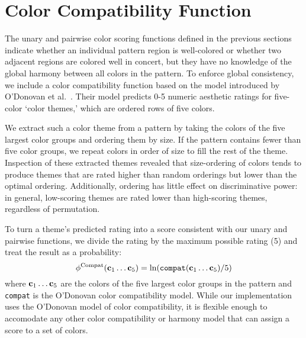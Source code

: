 \section{Color Compatibility Function}
\label{sec:colorCompat}

The unary and pairwise color scoring functions defined in the previous sections indicate whether an individual pattern region is well-colored or whether two adjacent regions are colored well in concert, but they have no knowledge of the global harmony between all colors in the pattern. To enforce global consistency, we include a color compatibility function based on the model introduced by O'Donovan et al.~. Their model predicts 0-5 numeric aesthetic ratings for five-color `color themes,' which are ordered rows of five colors. 

We extract such a color theme from a pattern by taking the colors of the five largest color groups and ordering them by size. If the pattern contains fewer than five color groups, we repeat colors in order of size to fill the rest of the theme. Inspection of these extracted themes revealed that size-ordering of colors tends to produce themes that are rated higher than random orderings but lower than the optimal ordering. Additionally, ordering has little effect on discriminative power: in general, low-scoring themes are rated lower than high-scoring themes, regardless of permutation.

To turn a theme's predicted rating into a score consistent with our unary and pairwise functions, we divide the rating by the maximum possible rating (5) and treat the result as a probability:
\begin{equation*}
\phi^{\textrm{Compat}}(\mathbf{c}_1 \ldots \mathbf{c}_5) = \ln(\texttt{compat}(\mathbf{c}_1 \ldots \mathbf{c}_5) / 5)
\end{equation*}
where $\mathbf{c}_1 \ldots \mathbf{c}_5$ are the colors of the five largest color groups in the pattern and \texttt{compat} is the O'Donovan color compatibility model. While our implementation uses the O'Donovan model of color compatibility, it is flexible enough to accomodate any other color compatibility or harmony model that can assign a score to a set of colors.

